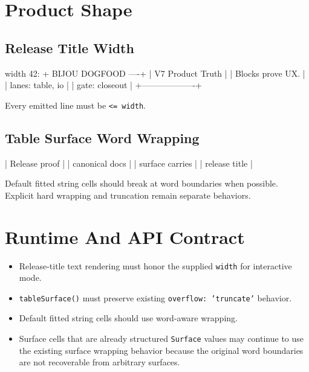 \section{Product Shape}\label{record-136-product-shape}

\subsection{Release Title Width}\label{record-136-release-title-width}

\begin{CodeBlock}
width 42:
+ BIJOU DOGFOOD ----+
| V7 Product Truth  |
| Blocks prove UX.  |
| lanes: table, io  |
| gate: closeout    |
+-------------------+
\end{CodeBlock}

Every emitted line must be \texttt{<\allowbreak{}=\allowbreak{} \allowbreak{}w\allowbreak{}i\allowbreak{}d\allowbreak{}t\allowbreak{}h}.

\subsection{Table Surface Word Wrapping}\label{record-136-table-surface-word-wrapping}

\begin{CodeBlock}
| Release proof     |
| canonical docs    |
| surface carries   |
| release title     |
\end{CodeBlock}

Default fitted string cells should break at word boundaries when possible. Explicit hard wrapping and truncation remain separate behaviors.

\section{Runtime And API Contract}\label{record-136-runtime-and-api-contract}

\begin{itemize}
\tightlist
\item
  Release-title text rendering must honor the supplied \texttt{w\allowbreak{}i\allowbreak{}d\allowbreak{}t\allowbreak{}h} for interactive mode.
\item
  \texttt{t\allowbreak{}a\allowbreak{}b\allowbreak{}l\allowbreak{}e\allowbreak{}S\allowbreak{}u\allowbreak{}r\allowbreak{}f\allowbreak{}a\allowbreak{}c\allowbreak{}e\allowbreak{}(\allowbreak{})} must preserve existing \texttt{o\allowbreak{}v\allowbreak{}e\allowbreak{}r\allowbreak{}f\allowbreak{}l\allowbreak{}o\allowbreak{}w\allowbreak{}:\allowbreak{} \allowbreak{}'\allowbreak{}t\allowbreak{}r\allowbreak{}u\allowbreak{}n\allowbreak{}c\allowbreak{}a\allowbreak{}t\allowbreak{}e\allowbreak{}'} behavior.
\item
  Default fitted string cells should use word-aware wrapping.
\item
  Surface cells that are already structured \texttt{S\allowbreak{}u\allowbreak{}r\allowbreak{}f\allowbreak{}a\allowbreak{}c\allowbreak{}e} values may continue to use the existing surface wrapping behavior because the original word boundaries are not recoverable from arbitrary surfaces.
\end{itemize}

